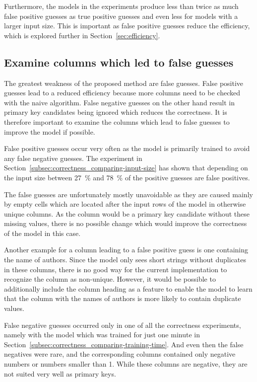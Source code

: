 Furthermore, the models in the experiments produce less than twice as much false positive guesses as true positive guesses and even less for models with a larger input size. This is important as false positive guesses reduce the efficiency, which is explored further in Section~\ref{sec:efficiency}.



\subsection{Examine columns which led to false guesses}\label{subsec:correctness_examine-false-guesses} %
The greatest weakness of the proposed method are false guesses. False positive guesses lead to a reduced efficiency because more columns need to be checked with the naive algorithm. False negative guesses on the other hand result in primary key candidates being ignored which reduces the correctness. It is therefore important to examine the columns which lead to false guesses to improve the model if possible.

False positive guesses occur very often as the model is primarily trained to avoid any false negative guesses. The experiment in Section~\ref{subsec:correctness_comparing-input-size} has shown that depending on the input size between \SI{27}{\percent} and \SI{78}{\percent} of the positive guesses are false positives.

The false guesses are unfortunately mostly unavoidable as they are caused mainly by empty cells which are located after the input rows of the model in otherwise unique columns. As the column would be a primary key candidate without these missing values, there is no possible change which would improve the correctness of the model in this case.

Another example for a column leading to a false positive guess is one containing the name of authors. Since the model only sees short strings without duplicates in these columns, there is no good way for the current implementation to recognize the column as non-unique. However, it would be possible to additionally include the column heading as a feature to enable the model to learn that the column with the names of authors is more likely to contain duplicate values.

False negative guesses occurred only in one of all the correctness experiments, namely with the model which was trained for just one minute in Section~\ref{subsec:correctness_comparing-training-time}. And even then the false negatives were rare, and the corresponding columns contained only negative numbers or numbers smaller than 1. While these columns are negative, they are not suited very well as primary keys. %

